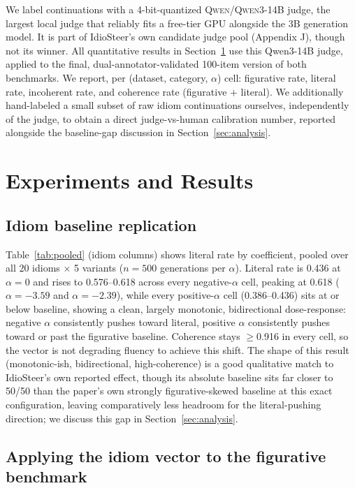 \documentclass[11pt]{article}
\begin{document}
We label continuations with a 4-bit-quantized \textsc{Qwen/Qwen3-14B} judge, the largest
local judge that reliably fits a free-tier GPU alongside the 3B generation model. It is
part of IdioSteer's own candidate judge pool (Appendix J), though not its winner. All
quantitative results in Section~\ref{sec:results} use this Qwen3-14B judge, applied to
the final, dual-annotator-validated 100-item version of both benchmarks. We report, per
(dataset, category, $\alpha$) cell: figurative rate, literal rate, incoherent rate, and
coherence rate (figurative + literal). We additionally hand-labeled a small subset of raw
idiom continuations ourselves, independently of the judge, to obtain a direct
judge-vs-human calibration number, reported alongside the baseline-gap discussion in
Section~\ref{sec:analysis}.

\section{Experiments and Results}
\label{sec:results}

\subsection{Idiom baseline replication}

Table~\ref{tab:pooled} (idiom columns) shows literal rate by coefficient, pooled over all
20 idioms $\times$ 5 variants ($n=500$ generations per $\alpha$). Literal rate is 0.436 at
$\alpha=0$ and rises to 0.576--0.618 across every negative-$\alpha$ cell, peaking at 0.618
($\alpha=-3.59$ and $\alpha=-2.39$), while every positive-$\alpha$ cell (0.386--0.436) sits
at or below baseline, showing a clean, largely monotonic, bidirectional dose-response:
negative $\alpha$ consistently pushes toward literal, positive $\alpha$ consistently
pushes toward or past the figurative baseline. Coherence stays $\geq$0.916 in every cell,
so the vector is not degrading fluency to achieve this shift. The shape of this result
(monotonic-ish, bidirectional, high-coherence) is a good qualitative match to IdioSteer's
own reported effect, though its absolute baseline sits far closer to 50/50 than the
paper's own strongly figurative-skewed baseline at this exact configuration, leaving
comparatively less headroom for the literal-pushing direction; we discuss this gap in
Section~\ref{sec:analysis}.

\subsection{Applying the idiom vector to the figurative benchmark}
\end{document}
